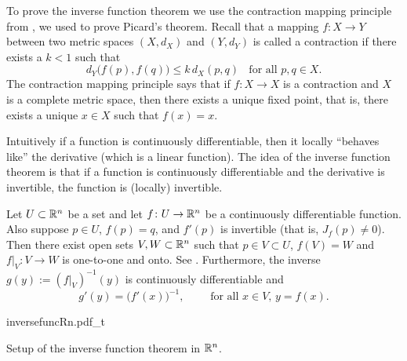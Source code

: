 
To prove the inverse function theorem we use the contraction mapping
principle from ,
we used
to prove Picard's theorem.
Recall that a mapping $f \colon X \to Y$ between two metric
spaces $(X,d_X)$ and $(Y,d_Y)$ is called a contraction 
if there exists a $k < 1$ such that
\begin{equation*}
d_Y\bigl(f(p),f(q)\bigr) \leq k \, d_X(p,q)
\ \ \ \ \text{for all } p,q \in X.
\end{equation*}
The contraction mapping principle says that if $f \colon X \to X$
is a contraction and $X$ is a complete metric space,
then there exists a unique fixed point, that is,
there exists a unique $x \in X$ such that $f(x) = x$.

Intuitively if a function is continuously differentiable, then it
locally ``behaves like'' the derivative (which is a linear function).
The idea of the inverse function theorem is that if a function is
continuously differentiable and the derivative is invertible, the function is
(locally) invertible.


\begin{thm}
\label{thm:inverse}
Let $U \subset {\mathbb{R}}^n$ be a set and let
$f \colon U \to {\mathbb{R}}^n$ be a continuously differentiable function.
Also suppose $p \in U$, $f(p) = q$, and $f'(p)$ is invertible
(that is, $J_f(p) \not=0$).
Then there exist open sets $V, W \subset {\mathbb{R}}^n$ such that
$p \in V \subset U$, $f(V) = W$ and $f|_V \colon V \to W$ is one-to-one and onto.  
See .
Furthermore, the inverse $g(y) := (f|_V)^{-1}(y)$ is continuously differentiable
and 
\begin{equation*}
g'(y) = {\bigl(f'(x)\bigr)}^{-1}, \qquad \text{ for all $x \in V$, $y = f(x)$.}
\end{equation*}
\end{thm}

\begin{myfigureht}
{inversefuncRn.pdf_t}
\caption{Setup of the inverse function theorem in ${\mathbb{R}}^n$.\label{fig:inversefuncRn}}
\end{myfigureht}

